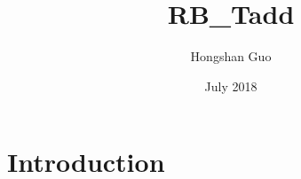 \documentclass{article}
\title{RB_Tadd}
\author{Hongshan Guo}
\date{July 2018}
\begin{document}
\maketitle

\section{Introduction}
\end{document}
